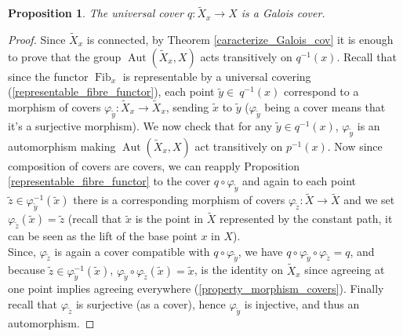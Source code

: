 \documentclass{article}
\theoremstyle{plain}
\newtheorem{proposition}[theorem]{Proposition}
\theoremstyle{definition}
\DeclareMathOperator{\Fib}{Fib}
\DeclareMathOperator{\Aut}{Aut}
\begin{document}

\begin{proposition}
\label{unive_cov_galois}
    The universal cover $q : \widetilde{X}_x\rightarrow X$ is a Galois cover.
\end{proposition}
\begin{proof}
    Since $\widetilde{X}_x$ is connected, by Theorem \ref{caracterize_Galois_cov} it is enough to prove that the group $\Aut(\widetilde{X}_x,X)$ acts transitively on $q^{-1}(x)$.
    Recall that since the functor $\Fib_x$ is representable by a universal covering (\ref{representable_fibre_functor}), each point $\widetilde{y}\in\ q^{-1}(x)$ correspond to a morphism of covers $\varphi_{\widetilde{y}}:\widetilde{X}_x\rightarrow\widetilde{X}_x$, sending $\widetilde{x}$ to $\widetilde{y}$ ($\varphi_{\widetilde{y}}$ being a cover means that it's a surjective morphism).
    We now check that for any $\widetilde{y}\in q^{-1}(x)$, $\varphi_{\widetilde{y}}$ is an automorphism making $\Aut(\widetilde{X}_x,X)$ act transitively on $p^{-1}(x)$. 
    Now since composition of covers are covers, we can reapply Proposition \ref{representable_fibre_functor} to the cover $q\circ \varphi_{\widetilde{y}}$ and again to each point $\widetilde{z}\in\varphi^{-1}_{\widetilde{y}}(\widetilde{x})$ there is a corresponding morphism of covers $\varphi_{\widetilde{z}}:\widetilde{X}\rightarrow\widetilde{X}$ and we set $\varphi_{\widetilde{z}}(\widetilde{x}) = \widetilde{z}$ 
    (recall that $\widetilde{x}$ is the point in $\widetilde{X}$ represented by the constant path, it can be seen as the lift of the base point $x$ in $X$). \\
    Since, $\varphi_{\widetilde{z}}$ is again a cover compatible with $q\circ \varphi_{\widetilde{y}}$, we have $q\circ\varphi_{\widetilde{y}}\circ\varphi_{\widetilde{z}} = q$, 
    and because $\widetilde{z}\in \varphi_{\widetilde{y}}^{-1}(\widetilde{x})$, $\varphi_{\widetilde{y}}\circ\varphi_{\widetilde{z}}(\widetilde{x}) = \widetilde{x}$, is the identity on $\widetilde{X}_x$ since agreeing at one point implies agreeing everywhere (\ref{property_morphism_covers}). 
    Finally recall that $\varphi_{\widetilde{z}}$ is surjective (as a cover), hence $\varphi_{\widetilde{y}}$ is injective, and thus an automorphism.
\end{proof}
\end{document}
